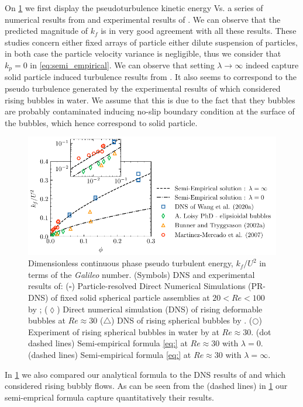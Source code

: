 On \ref{fig:trygvason} we first display the pseudoturbulence kinetic energy Vs. a series of numerical results from \citet{bunner2002dynamics,loisy2016direct,wang2021numerical} and experimental results of \citet{martinez2007measurement}.  
We can observe that the predicted magnitude of $k_f$ is in very good agreement with all these results. 
These studies concern either fixed arrays of particle either dilute suspension of particles, in both case the particle velocity variance is negligible, thus we consider that $k_p = 0$ in \ref{eq:semi_empirical}. 
We can observe that setting $\lambda \to\infty$ indeed capture solid particle induced turbulence results from \citet{wang2021numerical}. 
It also seems to correspond to the pseudo turbulence generated by the experimental results of \citet{martinez2007measurement} which considered rising bubbles in water. 
We assume that this is due to the fact that they bubbles are probably contaminated inducing no-slip boundary condition at the surface of the bubbles, which hence correspond to solid particle.  
\begin{figure}
    \centering
    \includegraphics[height = 0.35\textwidth]{image/HOMOGENEOUS_final/CA/KFliterature.pdf}
    \caption{Dimensionless continuous phase pseudo turbulent energy, $k_f/U^2$ in terms of the \textit{Galileo} number.
    (Symbols) DNS and experimental results of: 
    ($\pmb\square$)  Particle-resolved Direct Numerical Simulations (PR-DNS)
    of fixed solid spherical particle assemblies at $20< Re < 100$  by \citet{wang2021numerical}; 
    ($\pmb\lozenge$) Direct numerical simulation (DNS) of rising deformable bubbles at $Re \approx 30$ \citep{loisy2016direct}
    ($\pmb\triangle$) DNS of rising spherical bubbles by \citet{bunner2002dynamics}. 
    ($\pmb\bigcirc$) Experiment of rising spherical bubbles in water by \citet{martinez2007measurement} at $Re \approx 30$. 
    (dot dashed lines) Semi-empirical formula \ref{eq:} at $Re \approx 30$ with $\lambda = 0$. 
    (dashed lines)  Semi-empirical formula \ref{eq:} at $Re \approx 30$ with $\lambda = \infty$.
    }
    \label{fig:trygvason}
\end{figure}
In \ref{fig:trygvason} we also compared our analytical formula to the DNS results of \citet{bunner2002dynamics} and \citet{loisy2016direct} which considered rising bubbly flows. 
As can be seen from the (dashed lines) in \ref{fig:trygvason} our semi-emprical formula capture quantitatively their results. 

